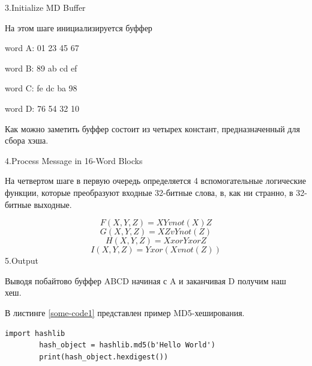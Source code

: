 \documentclass[a4paper, 12pt, oneside]{scrartcl}
\begin{document}
	3.Initialize MD Buffer\par
	На этом шаге инициализируется буффер\par
	word A: 01 23 45 67\par
	word B: 89 ab cd ef\par
	word C: fe dc ba 98\par
	word D: 76 54 32 10\par
	Как можно заметить буффер состоит из четырех констант, предназначенный для сбора хэша.\par
	4.Process Message in 16-Word Blocks\par
	На четвертом шаге в первую очередь определяется 4 вспомогательные логические функции, которые преобразуют входные 32-битные слова, в, как ни странно, в 32-битные выходные.\par
	\begin{equation}
		F(X,Y,Z) = XY v not(X) Z
		\label{Qulon_lo1}
	\end{equation}
	\begin{equation}
		G(X,Y,Z) = XZ v Y not(Z)
		\label{Qulon_lo2}
	\end{equation}
	\begin{equation}
		H(X,Y,Z) = X xor Y xor Z
		\label{Qulon_lo3}
	\end{equation}
	\begin{equation}
		I(X,Y,Z) = Y xor (X v not(Z))
		\label{Qulon_lo4}
	\end{equation}
	5.Output\par
	Выводя побайтово буффер ABCD начиная с A и заканчивая D получим наш хеш.~\cite{md2}\par
	В листинге \ref{some-code1} представлен пример MD5-хеширования.\par
	
	\begin{lstlisting}[label=some-code1,caption= MD5]
		import hashlib
		hash_object = hashlib.md5(b'Hello World')
		print(hash_object.hexdigest())
	\end{lstlisting}
\end{document}
